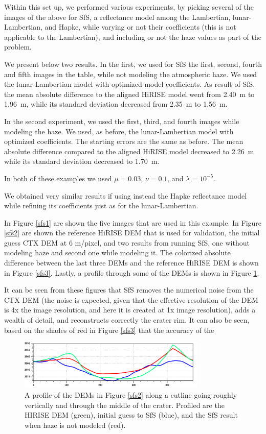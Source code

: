 \documentclass[draft,linenumbers]{agujournal}
\begin{document}
Within this set up, we performed various experiments, by picking several of the images of the above for SfS, a reflectance model among the Lambertian, lunar-Lambertian, and Hapke, while varying or not their coefficients (this is not applicable to the Lambertian), and including or not the haze values as part of the problem. 

We present below two results. In the first, we used for SfS the first, second, fourth and fifth images in the table, while not modeling the atmospheric haze. We used the lunar-Lambertian model with optimized model coefficients. As result of SfS, the mean absolute difference to the aligned HiRISE model went from 2.40~m to 1.96~m, while its standard deviation decreased from 2.35~m to 1.56~m.

In the second experiment, we used the first, third, and fourth images while modeling the haze. We used, as before, the lunar-Lambertian model with optimized coefficients. The starting errors are the same as before. The mean absolute difference compared to the aligned HiRISE model decreased to 2.26~m while its standard deviation decreased to 1.70~m. 

In both of these examples we used $\mu=0.03$, $\nu=0.1$, and $\lambda=10^{-5}.$

We obtained very similar results if using instead the Hapke reflectance model while refining its coefficients just as for the lunar-Lambertian. 

In Figure \ref{sfs1} are shown the five images that are used in this example. In Figure \ref{sfs2} are shown the reference HiRISE DEM that is used for validation, the initial guess CTX DEM at 6 m/pixel, and two results from running SfS, one without modeling haze and second one while modeling it. The colorized absolute difference between the last three DEMs and the reference HiRISE DEM is shown in Figure \ref{sfs3}. Lastly, a profile through some of the DEMs is shown in Figure \ref{profile}. 

It can be seen from these figures that SfS removes the numerical noise from the CTX DEM (the noise is expected, given that the effective resolution of the DEM is 4x the image resolution, and here it is created at 1x image resolution), adds a wealth of detail, and reconstructs correctly the crater rim. It can also be seen, based on the shades of red in Figure \ref{sfs3} that the accuracy of the   

\begin{figure}[h!]
\centering
\includegraphics[width=0.8\textwidth]{profile.png}
\caption[sfs]{A profile of the DEMs in Figure \ref{sfs2} along a cutline going roughly vertically and through the middle of the crater. Profiled are the HIRISE DEM (green), initial guess to SfS (blue), and the SfS result when haze is not modeled (red).}
\label{profile}
\end{figure}
\end{document}
